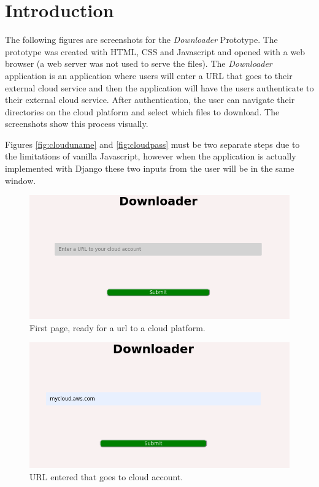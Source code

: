 \documentclass{article}
\title{}
\author{}
\date{}
\begin{document}
    

    \listoffigures

    \newpage

    \section{Introduction}
    The following figures are screenshots for the \textit{Downloader} Prototype. The prototype was created with HTML, CSS
    and Javascript and opened with a web browser (a web server was not used to serve the files). The \textit{Downloader}
    application is an application where users will enter a URL that goes to their external cloud service and then the
    application will have the users authenticate to their external cloud service. After authentication, the user can
    navigate their directories on the cloud platform and select which files to download. The screenshots show this
    process visually.

    Figures \ref{fig:clouduname} and \ref{fig:cloudpass} must be two separate steps due to the limitations of vanilla
    Javascript, however when the application is actually implemented with Django these two inputs from the user will be
    in the same window.

    \begin{figure}[h]
    \includegraphics[scale=.7]{s0}
        \caption{First page, ready for a url to a cloud platform.}
    \end{figure}

    \begin{figure}[h]
    \includegraphics[scale=.7]{s1}
        \caption{URL entered that goes to cloud account.}
    \end{figure}
\end{document}

